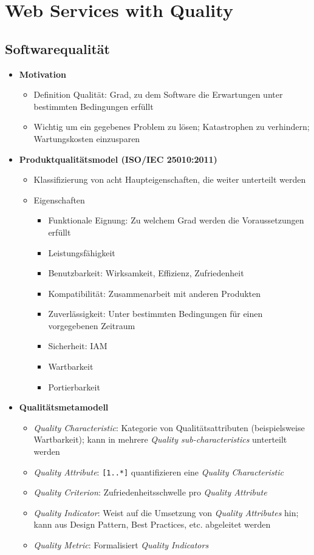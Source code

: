 \section{Web Services with Quality}

\subsection{Softwarequalität}
\begin{itemize}
	\item \textbf{Motivation}
	\begin{itemize}
		\item Definition Qualität: Grad, zu dem Software die Erwartungen unter bestimmten Bedingungen erfüllt
		\item Wichtig um ein gegebenes Problem zu lösen; Katastrophen zu verhindern; Wartungskosten einzusparen
	\end{itemize}
	\item \textbf{Produktqualitätsmodel (ISO/IEC 25010:2011)}
	\begin{itemize}
		\item Klassifizierung von acht Haupteigenschaften, die weiter unterteilt werden
		\item Eigenschaften
		\begin{itemize}
			\item Funktionale Eignung: Zu welchem Grad werden die Voraussetzungen erfüllt
			\item Leistungsfähigkeit
			\item Benutzbarkeit: Wirksamkeit, Effizienz, Zufriedenheit
			\item Kompatibilität: Zusammenarbeit mit anderen Produkten
			\item Zuverlässigkeit: Unter bestimmten Bedingungen für einen vorgegebenen Zeitraum
			\item Sicherheit: IAM
			\item Wartbarkeit
			\item Portierbarkeit
		\end{itemize}
	\end{itemize}
	\item \textbf{Qualitätsmetamodell}
	\begin{itemize}
		\item \textit{Quality Characteristic}: Kategorie von Qualitätsattributen (beispielsweise Wartbarkeit); kann in mehrere \textit{Quality sub-characteristics} unterteilt werden
		\item \textit{Quality Attribute}: \texttt{[1..*]} quantifizieren eine \textit{Quality Characteristic}
		\item \textit{Quality Criterion}: Zufriedenheitsschwelle pro \textit{Quality Attribute}
		\item \textit{Quality Indicator}: Weist auf die Umsetzung von \textit{Quality Attributes} hin; kann aus Design Pattern, Best Practices, etc. abgeleitet werden
		\item \textit{Quality Metric}: Formalisiert \textit{Quality Indicators}
	\end{itemize}
\end{itemize}


